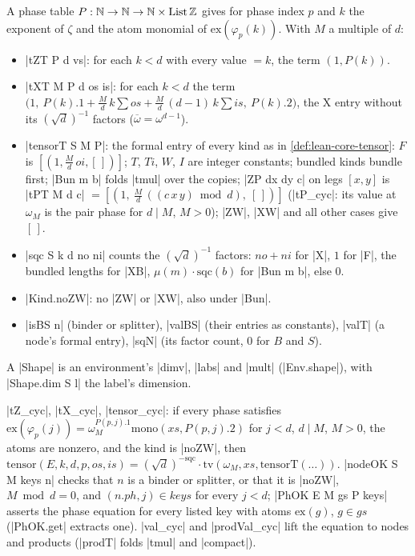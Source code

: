 \begin{definition}
A phase table $P:\mathbb{N}\to\mathbb{N}\to\mathbb{N}\times\mathrm{List}\,\mathbb{Z}$ gives for phase index $p$ and $k$ the exponent of
$\zeta$ and the atom monomial of $\mathrm{ex}(\varphi_p(k))$. With $M$ a multiple of $d$:
\begin{itemize}
\item \lean|tZT P d vs|: for each $k<d$ with every value $=k$, the term $(1,P(k))$.
\item \lean|tXT M P d os is|: for each $k<d$ the term
  $\bigl(1,\ P(k).1+\tfrac Md\,k\textstyle\sum os+\tfrac Md\,(d-1)\,k\sum is,\ P(k).2\bigr)$, the X entry
  without its $(\sqrt d)^{-1}$ factors ($\overline\omega=\omega^{d-1}$).
\item \lean|tensorT S M P|: the formal entry of every kind as in \cref{def:lean-core-tensor}: $F$ is
  $[(1,\tfrac Md\,oi,[\,])]$; $T$, $Ti$, $W$, $I$ are integer constants; bundled kinds bundle first;
  \lean|Bun m b| folds \lean|tmul| over the copies; \lean|ZP dx dy c| on legs $[x,y]$ is
  \lean|tPT M d c| $=[(1,\ \tfrac Md\,((c\,x\,y)\bmod d),\ [\,])]$ (\lean|tP_cyc|: its value at
  $\omega_M$ is the pair phase for $d\mid M$, $M>0$); \lean|ZW|, \lean|XW| and all other cases give
  $[\,]$.
\item \lean|sqc S k d no ni| counts the $(\sqrt d)^{-1}$ factors: $no+ni$ for \lean|X|, $1$ for
  \lean|F|, the bundled lengths for \lean|XB|, $\mu(m)\cdot\mathrm{sqc}(b)$ for \lean|Bun m b|, else $0$.
\item \lean|Kind.noZW|: no \lean|ZW| or \lean|XW|, also under \lean|Bun|.
\item \lean|isBS n| (binder or splitter), \lean|valBS| (their entries as constants), \lean|valT| (a
  node's formal entry), \lean|sqN| (its factor count, $0$ for $B$ and $S$).
\end{itemize}
A \lean|Shape| is an environment's \lean|dimv|, \lean|labs| and \lean|mult| (\lean|Env.shape|), with
\lean|Shape.dim S l| the label's dimension.
\end{definition}

\begin{theorem}
\lean|tZ_cyc|, \lean|tX_cyc|, \lean|tensor_cyc|: if every phase satisfies
$\mathrm{ex}(\varphi_p(j))=\omega_M^{P(p,j).1}\mathrm{mono}(xs,P(p,j).2)$ for $j<d$, $d\mid M$, $M>0$, the atoms
are nonzero, and the kind is \lean|noZW|, then
$\mathrm{tensor}(E,k,d,p,os,is)=(\sqrt d)^{-\mathrm{sqc}}\cdot\mathrm{tv}(\omega_M,xs,\mathrm{tensorT}(\ldots))$.
\lean|nodeOK S M keys n| checks that $n$ is a binder or splitter, or that it is \lean|noZW|, $M\bmod
d=0$, and $(n.ph,j)\in keys$ for every $j<d$; \lean|PhOK E M gs P keys| asserts the phase equation for
every listed key with atoms $\mathrm{ex}(g)$, $g\in gs$ (\lean|PhOK.get| extracts one).
\lean|val_cyc| and \lean|prodVal_cyc| lift the equation to nodes and products (\lean|prodT| folds
\lean|tmul| and \lean|compact|).
\end{theorem}

